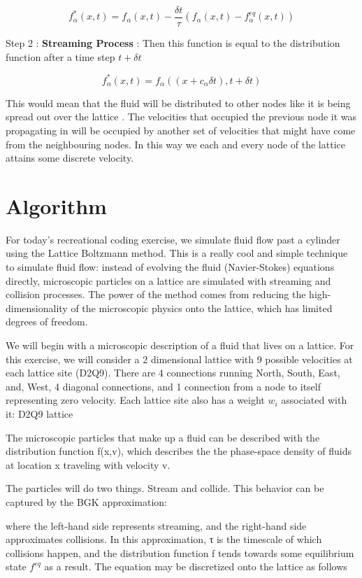 \documentclass{article}
\begin{document}
\[f^{*}_\alpha(x , t) = f_\alpha(x , t) - \frac{\delta t}{\tau}(f_\alpha(x ,t) - f^{eq}_\alpha(x , t))\]

Step 2 : \textbf{Streaming Process} : Then this function is equal to the distribution function after a time step $t + \delta t$ 

\[f^{*}_\alpha(x , t) = f_\alpha((x + c_\alpha \delta t) , t + \delta t) \]

This would mean that the fluid will be distributed to other nodes like it is being spread out over the lattice . The velocities that occupied the previous node it was propagating in will be occupied by another set of velocities that might have come from the neighbouring nodes. In this way we each and every node of the lattice attains some discrete velocity.

\section{Algorithm}
For today’s recreational coding exercise, we simulate fluid flow past a cylinder using the Lattice Boltzmann method. This is a really cool and simple technique to simulate fluid flow: instead of evolving the fluid (Navier-Stokes) equations directly, microscopic particles on a lattice are simulated with streaming and collision processes. The power of the method comes from reducing the high-dimensionality of the microscopic physics onto the lattice, which has limited degrees of freedom.

We will begin with a microscopic description of a fluid that lives on a lattice. For this exercise, we will consider a 2 dimensional lattice with 9 possible velocities at each lattice site (D2Q9). There are 4 connections running North, South, East, and, West, 4 diagonal connections, and 1 connection from a node to itself representing zero velocity. Each lattice site also has a weight $w_i$ associated with it:
D2Q9 lattice

The microscopic particles that make up a fluid can be described with the distribution function f(x,v), which describes the the phase-space density of fluids at location x traveling with velocity v.

The particles will do two things. Stream and collide. This behavior can be captured by the BGK approximation:

where the left-hand side represents streaming, and the right-hand side approximates collisions. In this approximation, τ is the timescale of which collisions happen, and the distribution function f tends towards some equilibrium state $f^{eq}$ as a result.
The equation may be discretized onto the lattice as follows
\end{document}
